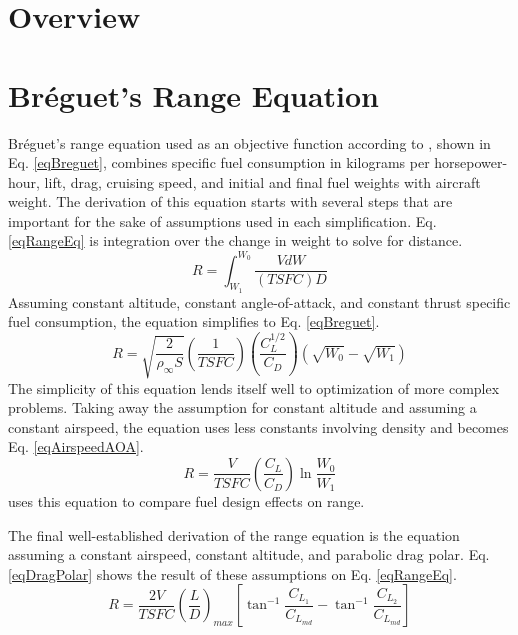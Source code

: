 \section{Overview}
\section{Br\'eguet's Range Equation}
\hspace{.5cm} Br\'eguet's range equation used as an objective function according to \cite{breguetRangeEqn}, shown in Eq. \ref{eqBreguet}, combines specific fuel consumption in kilograms per horsepower-hour, lift, drag, cruising speed, and initial and final fuel weights with aircraft weight. The derivation of this equation starts with several steps that are important for the sake of assumptions used in each simplification. Eq. \ref{eqRangeEq} is integration over the change in weight to solve for distance. 
\begin{equation}
    R = \int_{W_1}^{W_0}\dfrac{VdW}{(TSFC)D}
    \label{eqRangeEq}
\end{equation}
Assuming constant altitude, constant angle-of-attack, and constant thrust specific fuel consumption, the equation simplifies to Eq. \ref{eqBreguet}.
\begin{equation}
\label{eqBreguet}
R = \sqrt{\dfrac{2}{\rho_\infty S}}\left(\dfrac{1}{TSFC}\right) \left(\dfrac{C_L^{1/2}}{C_D}\right)(\sqrt{W_0}-\sqrt{W_1})
\end{equation}
The simplicity of this equation lends itself well to optimization of more complex problems. Taking away the assumption for constant altitude and assuming a constant airspeed, the equation uses less constants involving density and becomes Eq. \ref{eqAirspeedAOA}.
\begin{equation}
\label{eqAirspeedAOA}
    R = \dfrac{V}{TSFC}\left(\dfrac{C_L}{C_D}\right)\ln\dfrac{W_0}{W_1}
\end{equation}
\cite{fuelsLOGRange} uses this equation to compare fuel design effects on range. \par
The final well-established derivation of the range equation is the equation assuming a constant airspeed, constant altitude, and parabolic drag polar. Eq. \ref{eqDragPolar} shows the result of these assumptions on Eq. \ref{eqRangeEq}.
\begin{equation}
\label{eqDragPolar}
    R = \dfrac{2V}{TSFC}\left(\dfrac{L}{D}\right)_{max}\left[\tan^{-1}\dfrac{C_{L_1}}{C_{L_{md}}}-\tan^{-1}\dfrac{C_{L_2}}{C_{L_{md}}}\right]
\end{equation}
